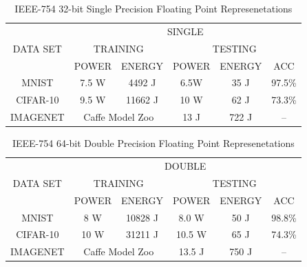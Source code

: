 \documentclass[letterpaper, 10 pt, conference]{ieeeconf}
\begin{document}
\begin{table}[ht]
  \centering
  \caption{IEEE-754 32-bit Single Precision Floating Point Represenetations}
  \label{single-table}
  \begin{tabular}{|c|c|c|c|c|c|}
    \hline
    \multirow{3}{*}{DATA SET} & \multicolumn{5}{c|}{SINGLE}                                                     \\ \cline{2-6} 
                              & \multicolumn{2}{c|}{TRAINING}                    & \multicolumn{3}{c|}{TESTING} \\ \cline{2-6} 
                              & POWER                  & ENERGY                  & POWER  & ENERGY  & ACC  \\ \hline
    MNIST                     & 7.5 W                  & 4492 J                  & 6.5W   & 35 J    & 97.5\%    \\ \hline
    CIFAR-10                  & 9.5 W                  & 11662 J                 & 10 W    & 62 J    & 73.3\%    \\ \hline
    IMAGENET                  & \multicolumn{2}{c|}{Caffe Model Zoo}             & 13 J   & 722 J   & --        \\ \hline
  \end{tabular}
\end{table}

\begin{table}[ht]
  \centering
  \caption{IEEE-754 64-bit Double Precision Floating Point Represenetations}
  \label{double-table}
  \begin{tabular}{|c|c|c|c|c|c|}
    \hline
    \multirow{3}{*}{DATA SET} & \multicolumn{5}{c|}{DOUBLE}                                                     \\ \cline{2-6} 
                              & \multicolumn{2}{c|}{TRAINING}                    & \multicolumn{3}{c|}{TESTING} \\ \cline{2-6} 
                              & POWER                  & ENERGY                  & POWER  & ENERGY  & ACC  \\ \hline
    MNIST                     & 8 W                    & 10828 J                 & 8.0 W  & 50 J    & 98.8\%    \\ \hline
    CIFAR-10                  & 10 W                   & 31211 J                 & 10.5 W & 65 J    & 74.3\%    \\ \hline
    IMAGENET                  & \multicolumn{2}{c|}{Caffe Model Zoo}             & 13.5 J & 750 J   & --        \\ \hline
  \end{tabular}
\end{table}
\end{document}
